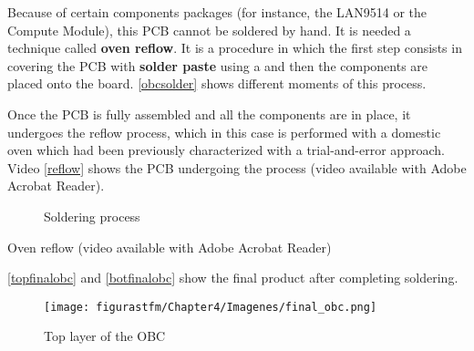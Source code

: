 Because of certain components packages (for instance, the LAN9514 or the Compute Module), this \acrshort{PCB} cannot be soldered by hand. It is needed a technique called \textbf{oven reflow}. It is a procedure in which the first step consists in covering the \acrshort{PCB} with \textbf{solder paste} using a  and then the components are placed onto the board. \autoref{obcsolder} shows different moments of this process.

Once the \acrshort{PCB} is fully assembled and all the components are in place, it undergoes the reflow process, which in this case is performed with a domestic oven which had been previously characterized with a trial-and-error approach. Video \autoref{reflow} shows the \acrshort{PCB} undergoing the process (video available with Adobe Acrobat Reader).


\begin{figure}[H]
			\centering
			\quad
			\caption{Soldering process} \label{obcsolder}
			\vspace{2cm}
\end{figure}

\begin{videoFloat}[H]
	\centering
{}
\vspace{2.8cm}
\caption{Oven reflow (video available with Adobe Acrobat Reader)} \label{reflow}
\end{videoFloat}

\newpage

\autoref{topfinalobc} and \autoref{botfinalobc} show the final product after completing soldering.


		\begin{figure} [H]
			\raggedright
			\begin{minipage}{10cm}
 			\texttt{[image: figurastfm/Chapter4/Imagenes/final\_obc.png]}
			\centering
			\caption{Top layer of the \acrshort{OBC}}     \label{topfinalobc}
			  \end{minipage}
			\vspace{-1cm}
\end{figure}


